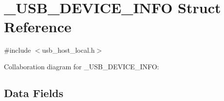 \hypertarget{struct___u_s_b___d_e_v_i_c_e___i_n_f_o}{}\section{\+\_\+\+U\+S\+B\+\_\+\+D\+E\+V\+I\+C\+E\+\_\+\+I\+N\+F\+O Struct Reference}
\label{struct___u_s_b___d_e_v_i_c_e___i_n_f_o}


{\ttfamily \#include $<$usb\+\_\+host\+\_\+local.\+h$>$}



Collaboration diagram for \+\_\+\+U\+S\+B\+\_\+\+D\+E\+V\+I\+C\+E\+\_\+\+I\+N\+F\+O\+:
\subsection*{Data Fields}
